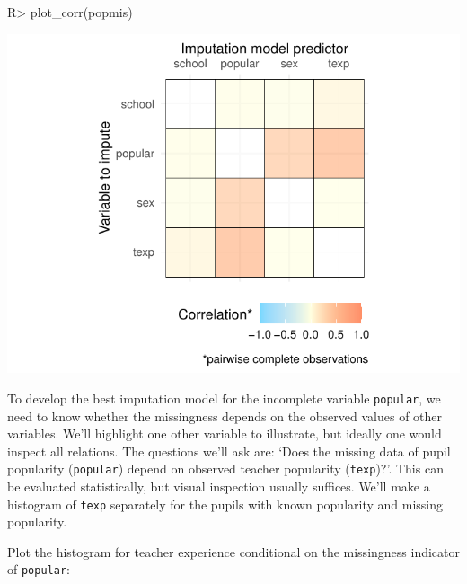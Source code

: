 \documentclass[
]{jss}
\begin{document}
\begin{CodeChunk}
\begin{CodeInput}
R> plot_corr(popmis)
\end{CodeInput}


\begin{center}\includegraphics{Imputation_of_Incomplete_Multilevel_Data_files/figure-latex/pop-corr-1} \end{center}

\end{CodeChunk}

To develop the best imputation model for the incomplete variable
\texttt{popular}, we need to know whether the missingness depends on the
observed values of other variables. We'll highlight one other variable
to illustrate, but ideally one would inspect all relations. The
questions we'll ask are: `Does the missing data of pupil popularity
(\texttt{popular}) depend on observed teacher popularity
(\texttt{texp})?'. This can be evaluated statistically, but visual
inspection usually suffices. We'll make a histogram of \texttt{texp}
separately for the pupils with known popularity and missing popularity.

Plot the histogram for teacher experience conditional on the missingness
indicator of \texttt{popular}:
\end{document}
